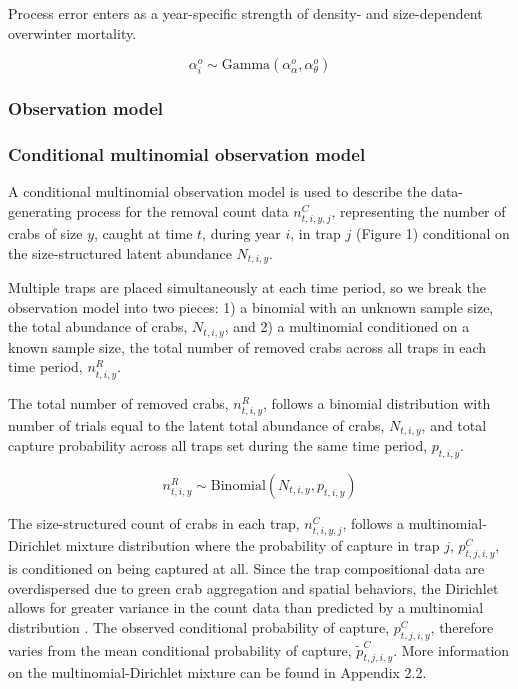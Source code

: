 \documentclass{article}
\begin{document}
Process error enters as a year-specific strength of density- and size-dependent overwinter mortality.

\begin{equation}
\alpha^o_i \sim \text{Gamma}(\alpha^o_{\alpha}, \alpha^o_{\theta})
\end{equation}

\subsubsection{Observation model}

\subsubsection*{Conditional multinomial observation model}

A conditional multinomial observation model is used to describe the data-generating process for the removal count data $n^C_{t,i,y,j}$, representing the number of crabs of size $y$, caught at time $t$, during year $i$, in trap $j$ (Figure 1) \parencite{kery2015modeling} conditional on the size-structured latent abundance $N_{t,i,y}$. 

Multiple traps are placed simultaneously at each time period, so we break the observation model into two pieces: 1) a binomial with an unknown sample size, the total abundance of crabs, $N_{t,i,y}$, and 2) a multinomial conditioned on a known sample size, the total number of removed crabs across all traps in each time period, $n^R_{t,i,y}$.

The total number of removed crabs, $n^R_{t,i,y}$, follows a binomial distribution with number of trials equal to the latent total abundance of crabs, $N_{t,i,y}$, and total capture probability across all traps set during the same time period, $p_{t,i,y}$.

\begin{equation}
n^R_{t,i,y} \sim \text{Binomial}(N_{t,i,y}, p_{t,i,y})
\end{equation}

The size-structured count of crabs in each trap, $n^C_{t,i,y,j}$, follows a multinomial-Dirichlet mixture distribution where the probability of capture in trap $j$, $p^C_{t,j,i,y}$, is conditioned on being captured at all. Since the trap compositional data are overdispersed due to green crab aggregation and spatial behaviors, the Dirichlet allows for greater variance in the count data than predicted by a multinomial distribution \parencite{thorson2017model}. The observed conditional probability of capture, $p^C_{t,j,i,y}$, therefore varies from the mean conditional probability of capture, $\tilde{p}^C_{t,j,i,y}$. More information on the multinomial-Dirichlet mixture can be found in Appendix 2.2.
\end{document}
